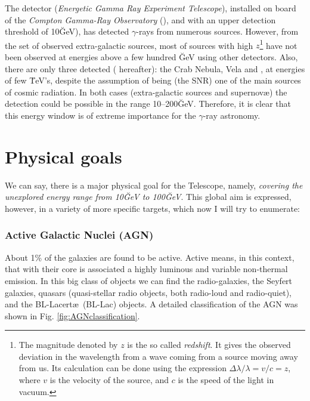 The    detector      (\emph{Energetic Gamma  Ray   Experiment
  Telescope}),  installed  on  board  of the  \emph{Compton  Gamma-Ray
  Observatory} (),  and  with an upper detection  threshold of
10\u{GeV}),   has  detected   $\gamma$-rays  from   numerous sources.  
However, from the set of observed extra-galactic
sources, most of sources with high %
%
$z$\footnote{The magnitude      denoted  by $z$    is   the  so called
  \emph{redshift}.  It gives  the observed deviation in the wavelength
  from  a  wave  coming   from a source   moving away   from  us.  Its
  calculation    can       be    done     using    the      expression
  $\Delta\lambda/\lambda=v/c=z$, where $v$   is  the velocity   of the
  source, and $c$ is the speed of
  the light in vacuum.} %
%
have not been observed at  energies above a  few hundred \u{GeV} using
other    detectors.     Also,   there   are   only     three  detected
\emph{} (  hereafter):   the
Crab Nebula, Vela and   ,  at energies of   few \u{TeV}'s,
despite the assumption of  being (the SNR) one of  the main sources of
cosmic radiation.   In   both    cases  (extra-galactic sources    and
supernov{\ae})   the  detection  could  be   possible  in  the   range
10--200\u{GeV}.  Therefore, it is clear  that this energy window is of
extreme importance for the $\gamma$-ray astronomy.

\CGROenergiesfig

\section{Physical goals}
%
We can say, there is  a major physical goal  for the \MAGIC Telescope,
namely, \emph{covering the  unexplored energy range from 10\u{GeV}  to
  100\u{GeV}}. This global aim is expressed, however,  in a variety of
more specific targets, which now I will try to enumerate:

\subsubsection*{Active Galactic Nuclei (AGN)} 
%
About  1\% of the galaxies  are found to  be  active. Active means, in
this context, that with their core is associated a highly luminous and
variable non-thermal  emission. In this  big  class of  objects we can
find the radio-galaxies, the  Seyfert galaxies, quasars (quasi-stellar
radio  objects,    both  radio-loud   and  radio-quiet),     and   the
BL-Lacert{\ae}\ (BL-Lac) objects. A detailed classification of the AGN
was shown in Fig. \ref{fig:AGNclassification}.

